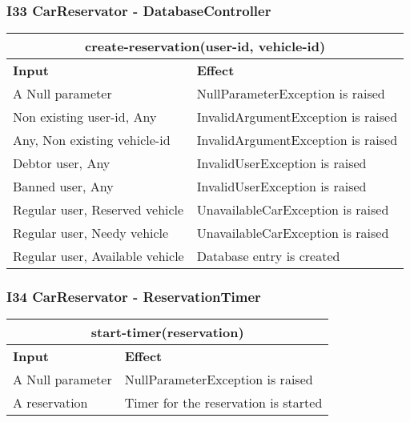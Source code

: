 \subsubsection{I33 CarReservator - DatabaseController} 
\begin{tabular}{|p{5cm}|p{7cm}|}
\hline
\multicolumn{2}{|c|}{create-reservation(user-id, vehicle-id)} \\
\hline
\textbf{Input} & \textbf{Effect} \\

\hline
A Null parameter & NullParameterException is raised \\

\hline
Non existing user-id, Any & InvalidArgumentException is raised \\

\hline
Any, Non existing vehicle-id & InvalidArgumentException is raised \\

\hline
Debtor user, Any & InvalidUserException is raised \\

\hline
Banned user, Any & InvalidUserException is raised \\

\hline
Regular user, Reserved vehicle & UnavailableCarException is raised \\

\hline
Regular user, Needy vehicle & UnavailableCarException is raised \\

\hline
Regular user, Available vehicle & Database entry is created \\
\hline
\end{tabular}


\subsubsection{I34 CarReservator - ReservationTimer}
\begin{tabular}{|p{5cm}|p{7cm}|}
\hline
\multicolumn{2}{|c|}{start-timer(reservation)} \\
\hline
\textbf{Input} & \textbf{Effect} \\
A Null parameter & NullParameterException is raised \\

\hline
A reservation & Timer for the reservation is started \\
\hline
\end{tabular}

